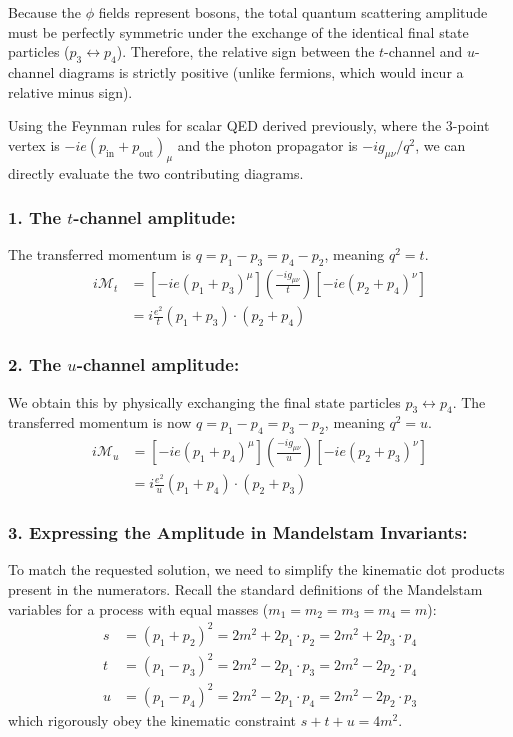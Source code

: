 
Because the $\phi$ fields represent bosons, the total quantum scattering amplitude must be perfectly symmetric under the exchange of the identical final state particles ($p_3 \leftrightarrow p_4$). Therefore, the relative sign between the $t$-channel and $u$-channel diagrams is strictly positive (unlike fermions, which would incur a relative minus sign).

Using the Feynman rules for scalar QED derived previously, where the 3-point vertex is $-ie(p_{\text{in}} + p_{\text{out}})_\mu$ and the photon propagator is $-ig_{\mu\nu}/q^2$, we can directly evaluate the two contributing diagrams.

\subsubsection*{1. The $t$-channel amplitude:}
The transferred momentum is $q = p_1 - p_3 = p_4 - p_2$, meaning $q^2 = t$.
\[
    \begin{aligned}
        i\mathcal{M}_t & = \left[ -ie(p_1 + p_3)^\mu \right] \left( \frac{-ig_{\mu\nu}}{t} \right) \left[ -ie(p_2 + p_4)^\nu \right] \\
                       & = i\frac{e^2}{t} (p_1 + p_3) \cdot (p_2 + p_4)
    \end{aligned}
\]

\subsubsection*{2. The $u$-channel amplitude:}
We obtain this by physically exchanging the final state particles $p_3 \leftrightarrow p_4$. The transferred momentum is now $q = p_1 - p_4 = p_3 - p_2$, meaning $q^2 = u$.
\[
    \begin{aligned}
        i\mathcal{M}_u & = \left[ -ie(p_1 + p_4)^\mu \right] \left( \frac{-ig_{\mu\nu}}{u} \right) \left[ -ie(p_2 + p_3)^\nu \right] \\
                       & = i\frac{e^2}{u} (p_1 + p_4) \cdot (p_2 + p_3)
    \end{aligned}
\]

\subsubsection*{3. Expressing the Amplitude in Mandelstam Invariants:}
To match the requested solution, we need to simplify the kinematic dot products present in the numerators. Recall the standard definitions of the Mandelstam variables for a process with equal masses ($m_1 = m_2 = m_3 = m_4 = m$):
\[
    \begin{aligned}
        s & = (p_1 + p_2)^2 = 2m^2 + 2p_1 \cdot p_2 = 2m^2 + 2p_3 \cdot p_4 \\
        t & = (p_1 - p_3)^2 = 2m^2 - 2p_1 \cdot p_3 = 2m^2 - 2p_2 \cdot p_4 \\
        u & = (p_1 - p_4)^2 = 2m^2 - 2p_1 \cdot p_4 = 2m^2 - 2p_2 \cdot p_3
    \end{aligned}
\]
which rigorously obey the kinematic constraint $s + t + u = 4m^2$.

